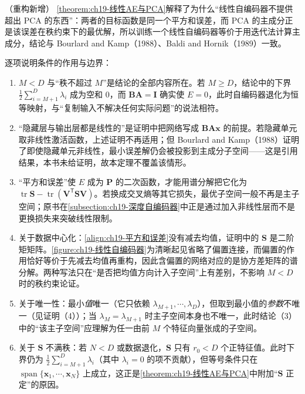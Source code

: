 \documentclass[../../main.tex]{subfiles}
\begin{document}
\begin{remark}（重构新增）
\cref{theorem:ch19-线性AE与PCA}解释了为什么“线性自编码器不提供超出 PCA 的东西”：两者的目标函数是同一个平方和误差，而 PCA 的主成分正是该误差在秩约束下的最优解，所以训练一个线性自编码器等价于用迭代法计算主成分，结论与 Bourlard and Kamp（1988）、Baldi and Hornik（1989）一致。

逐项说明条件的作用与边界：
\begin{enumerate}[(1)]
\item $M<D$ 与“秩不超过 $M$”是结论的全部内容所在。若 $M\geqslant D$，结论中的下界 $\frac{1}{2}\sum_{i=M+1}^{D}\lambda_i$ 成为空和 $0$，而 $\bm{B}\bm{A}=\bm{I}$ 确实使 $E=0$，此时自编码器退化为恒等映射，与“复制输入不解决任何实际问题”的说法相符。
\item “隐藏层与输出层都是线性的”是证明中把网络写成 $\bm{B}\bm{A}\bm{x}$ 的前提。若隐藏单元取非线性激活函数，上述证明不再适用；但 Bourlard and Kamp（1988）证明了即使隐藏单元非线性，最小误差解仍会被投影到主成分子空间——这是引用结果，本书未给证明，故本定理不覆盖该情形。
\item “平方和误差”使 $E$ 成为 $\bm{P}$ 的二次函数，才能用谱分解把它化为 $\operatorname{tr}\bm{S}-\operatorname{tr}(\bm{V}^{\mathsf T}\bm{S}\bm{V})$。若换成交叉熵等其它损失，最优子空间一般不再是主子空间；原书在\cref{subsection:ch19-深度自编码器}中正是通过加入非线性层而不是更换损失来突破线性限制。
\item 关于数据中心化：\eqref{align:ch19-平方和误差}没有减去均值，证明中的 $\bm{S}$ 是二阶矩矩阵。\cref{figure:ch19-线性自编码器}为清晰起见省略了偏置连接，而偏置的作用恰好等价于先减去均值再重构，因此含偏置的网络对应的是协方差矩阵的谱分解。两种写法只在“是否把均值方向计入子空间”上有差别，不影响 $M<D$ 时的秩约束论证。
\item 关于唯一性：最小\emph{值}唯一（它只依赖 $\lambda_{M+1},\cdots,\lambda_D$），但取到最小值的\emph{参数}不唯一（见证明（4））；当 $\lambda_M=\lambda_{M+1}$ 时主子空间本身也不唯一，此时结论（3）中的“该主子空间”应理解为任一由前 $M$ 个特征向量张成的子空间。
\item 关于 $\bm{S}$ 不满秩：若 $N<D$ 或数据退化，$\bm{S}$ 只有 $r_0<D$ 个正特征值。此时下界仍为 $\frac{1}{2}\sum_{i=M+1}^{D}\lambda_i$（其中 $\lambda_i=0$ 的项不贡献），但等号条件只在 $\operatorname{span}\{\bm{x}_1,\cdots,\bm{x}_N\}$ 上成立，这正是\cref{theorem:ch19-线性AE与PCA}中附加“$\bm{S}$ 正定”的原因。
\end{enumerate}
\end{remark}
\end{document}
